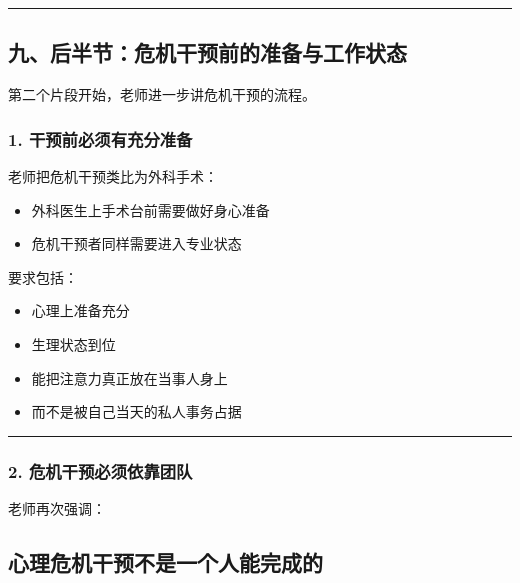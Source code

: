 \documentclass[
  chinese,
  9pt,
  a4paper,
]{ctexart}
\providecommand{\tightlist}{%
  \setlength{\itemsep}{0pt}\setlength{\parskip}{0pt}}
\begin{document}
\begin{center}\rule{0.5\linewidth}{0.5pt}\end{center}

\subsection{九、后半节：危机干预前的准备与工作状态}\label{ux4e5dux540eux534aux8282ux5371ux673aux5e72ux9884ux524dux7684ux51c6ux5907ux4e0eux5de5ux4f5cux72b6ux6001}

第二个片段开始，老师进一步讲危机干预的流程。

\subsubsection{1.
干预前必须有充分准备}\label{ux5e72ux9884ux524dux5fc5ux987bux6709ux5145ux5206ux51c6ux5907}

老师把危机干预类比为外科手术：

\begin{itemize}
\tightlist
\item
  外科医生上手术台前需要做好身心准备
\item
  危机干预者同样需要进入专业状态
\end{itemize}

要求包括：

\begin{itemize}
\tightlist
\item
  心理上准备充分
\item
  生理状态到位
\item
  能把注意力真正放在当事人身上
\item
  而不是被自己当天的私人事务占据
\end{itemize}

\begin{center}\rule{0.5\linewidth}{0.5pt}\end{center}

\subsubsection{2.
危机干预必须依靠团队}\label{ux5371ux673aux5e72ux9884ux5fc5ux987bux4f9dux9760ux56e2ux961f}

老师再次强调：

\subsection{心理危机干预不是一个人能完成的}\label{ux5fc3ux7406ux5371ux673aux5e72ux9884ux4e0dux662fux4e00ux4e2aux4ebaux80fdux5b8cux6210ux7684}
\end{document}
